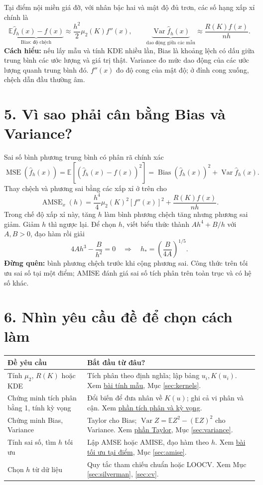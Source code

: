 \documentclass[11pt,a4paper]{article}
\DeclareMathOperator{\MSE}{MSE}
\newcommand{\E}{\mathbb E}
\DeclareMathOperator{\Var}{Var}
\DeclareMathOperator{\Bias}{Bias}
\DeclareMathOperator{\AMSE}{AMSE}
\begin{document}
Tại điểm nội miền giá đỡ, với nhân bậc hai và mật độ đủ trơn, các số hạng xấp xỉ chính là
\[
\underbrace{\E\widehat f_h(x)-f(x)}_{\text{Bias: độ chệch}}
\approx\frac{h^2}{2}\mu_2(K)f''(x),\qquad
\underbrace{\Var\widehat f_h(x)}_{\text{dao động giữa các mẫu}}
\approx\frac{R(K)f(x)}{nh}.
\]
\textbf{Cách hiểu:} nếu lấy mẫu và tính KDE nhiều lần, Bias là khoảng lệch có dấu giữa trung bình các ước lượng và giá trị thật. Variance đo mức dao động của các ước lượng quanh trung bình đó. $f''(x)$ đo độ cong của mật độ; ở đỉnh cong xuống, chệch dẫn đầu thường âm.

\section*{5. Vì sao phải cân bằng Bias và Variance?}
Sai số bình phương trung bình có phân rã chính xác
\[
\MSE(\widehat f_h(x))=\E[(\widehat f_h(x)-f(x))^2]
=\Bias(\widehat f_h(x))^2+\Var\widehat f_h(x).
\]
Thay chệch và phương sai bằng các xấp xỉ ở trên cho
\[
\boxed{\AMSE_x(h)=\frac{h^4}{4}\mu_2(K)^2[f''(x)]^2+\frac{R(K)f(x)}{nh}.}
\]
Trong chế độ xấp xỉ này, tăng $h$ làm bình phương chệch tăng nhưng phương sai giảm. Giảm $h$ thì ngược lại. Để chọn $h$, viết biểu thức thành $Ah^4+B/h$ với $A,B>0$, đạo hàm rồi giải
\[
4Ah^3-\frac{B}{h^2}=0
\quad\Longrightarrow\quad h_* =\left(\frac{B}{4A}\right)^{1/5}.
\]
\textbf{Đừng quên:} bình phương chệch trước khi cộng phương sai. Công thức trên tối ưu sai số tại một điểm; AMISE đánh giá sai số tích phân trên toàn trục và có hệ số khác.

\section*{6. Nhìn yêu cầu đề để chọn cách làm}
\begin{center}
\small
\begin{tabular}{p{}p{}}
\toprule
Đề yêu cầu & Bắt đầu từ đâu?\\
\midrule
Tính $\mu_2$, $R(K)$ hoặc KDE & Tích phân theo định nghĩa; lập bảng $u_i,K(u_i)$. Xem \hyperref[core:calculation]{bài tính mẫu}, Mục \ref{sec:kernels}.\\[3pt]
Chứng minh tích phân bằng 1, tính kỳ vọng & Đổi biến để đưa nhân về $K(u)$; ghi cả vi phân và cận. Xem \hyperref[core:expectation]{phần tích phân và kỳ vọng}.\\[3pt]
Chứng minh Bias, Variance & Taylor cho Bias; $\Var Z=\E Z^2-(\E Z)^2$ cho Variance. Xem \hyperref[core:bias]{phần Taylor}, Mục \ref{sec:variance}.\\[3pt]
Tính sai số, tìm $h$ tối ưu & Lập AMSE hoặc AMISE, đạo hàm theo $h$. Xem \hyperref[core:optimal]{bài tối ưu tại điểm}, Mục \ref{sec:amise}.\\[3pt]
Chọn $h$ từ dữ liệu & Quy tắc tham chiếu chuẩn hoặc LOOCV. Xem Mục \ref{sec:silverman}, \ref{sec:cv}.\\
\bottomrule
\end{tabular}
\end{center}
\clearpage
\end{document}
